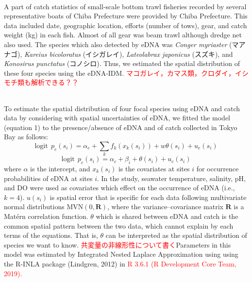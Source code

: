 \documentclass[12pt]{article}
\begin{document}
\begin{linenumbers}
\\
A part of catch statistics of small-scale bottom trawl fisheries recorded by several representative boats of Chiba Prefecture were provided by Chiba Prefecture. This data included date, geographic location, efforts (number of tows), gear, and catch weight (kg) in each fish. Almost of all gear was beam trawl although dredge net also used. The species which also detected by eDNA was \textit{Conger myriaster} (マアナゴ), \textit{Kareius bicoloratus} (イシガレイ), \textit{Lateolabrax japonicus} (スズキ), and \textit{Konosirus punctatus} (コノシロ). Thus, we estimated the spatial distribution of these four species using the eDNA-IDM. \textcolor{red}{マコガレイ，カマス類，クロダイ，イシモチ類も解析できる？？}

\\
To estimate the spatial distribution of four focal species using eDNA and catch data by considering with spatial  uncertainties of eDNA, we fitted the model (equation 1) to the presence/absence of eDNA and of catch collected in Tokyo Bay as follows:
\[
\mathrm{logit} \ \ p_{e}(s_{i}) = \alpha_{e} + \sum_{k}f_{k}(x_{k}(s_{i})) + w \theta(s_{i}) + u_{e}(s_{i})
\]
\[
\mathrm{logit} \ \ p_{c}(s_{i}) = \alpha_{c} + \beta_{i} + \theta(s_{i}) + u_{c}(s_{i})
\]
where $\alpha$ is the intercept, and $x_{k}(s_{i})$ is the covariates at sites $i$ for occurrence probabilities of eDNA at sites $i$. In the study, seawater temperature, salinity, pH, and DO were used as covariates which effect on the occurrence of eDNA (i.e., $k = 4$). $u(s_{i})$ is spatial error that is specific for each data following multivariate normal distributions $\mathrm{MVN}(0, \mathbf{R})$, where the variance--covariance matrix $\mathbf{R}$ is a Mat\'{e}rn correlation function. $\theta$ which is shared between eDNA and catch is the common spatial pattern between the two data, which cannot explain by each terms of the equations. That is, $\theta$ can be interpreted as the spatial distribution of species we want to know. \textcolor{red}{共変量の非線形性について書く}Parameters in this model was estimated by Integrated Nested Laplace Approximation using using the R-INLA package (Lindgren, 2012) in \textcolor{red}{R 3.6.1 (R Development Core Team, 2019).}
\ \ \ \ \ \ \ \ \ \ 





\end{linenumbers}
\end{document}
